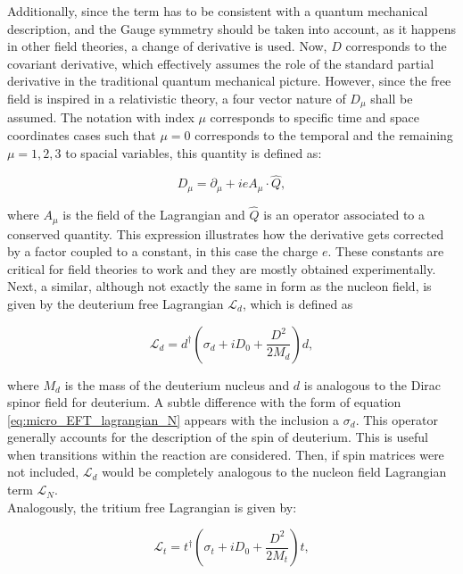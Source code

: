 \documentclass[openany]{book}
\begin{document}
Additionally, since the term has to be consistent with a quantum mechanical description, and the Gauge symmetry should be taken into account, as it happens in other field theories, a change of derivative is used. Now, $D$ corresponds to the covariant derivative, which effectively assumes the role of the standard partial derivative in the traditional quantum mechanical picture. However, since the free field is inspired in a relativistic theory, a four vector nature of $D_\mu$ shall be assumed. The notation with index $\mu$ corresponds to specific time and space coordinates cases such that  $\mu = 0$  corresponds to the temporal and the remaining $\mu = 1, 2, 3$ to spacial variables,  this quantity is defined as:

\begin{equation}\label{eq:micro_EFT_covariantDerivative}
	D_\mu = \partial_\mu  + i e A_\mu \cdot \hat Q,
\end{equation}

where $A_\mu$ is the field of the Lagrangian and $\hat Q$ is an operator associated to a conserved quantity. This expression illustrates how the derivative gets corrected by a factor coupled to a constant, in this case the charge $e$. These constants are critical for field theories to work and they are mostly obtained experimentally. \\

Next, a similar, although not exactly the same in form as the nucleon field, is given by the deuterium free Lagrangian $\mathcal{L}_d$, which is defined as

\begin{equation}\label{eq:micro_EFT_lagrangian_d}
	\mathcal{L}_d  = d^{\dagger} \left( \sigma_d + i D_0 + \frac{D^2}{2M_d} \right) d,
\end{equation}

where $M_d$ is the mass of the deuterium nucleus and $d$ is analogous to the Dirac spinor field for deuterium. A subtle difference with the form of equation \ref{eq:micro_EFT_lagrangian_N} appears with the inclusion a $\sigma_d$. This operator generally accounts for the description of the spin of deuterium. This is useful when transitions within the reaction are considered. Then, if spin matrices were not included, $\mathcal{L}_d$ would be completely analogous to the nucleon field Lagrangian term $\mathcal{L}_N$.  \\

Analogously, the tritium free Lagrangian is given by: 

\begin{equation}\label{eq:micro_EFT_lagrangian_t}
	\mathcal{L}_t  = t^{\dagger} \left( \sigma_t + i D_0 + \frac{D^2}{2M_t} \right) t,
\end{equation}
\end{document}
